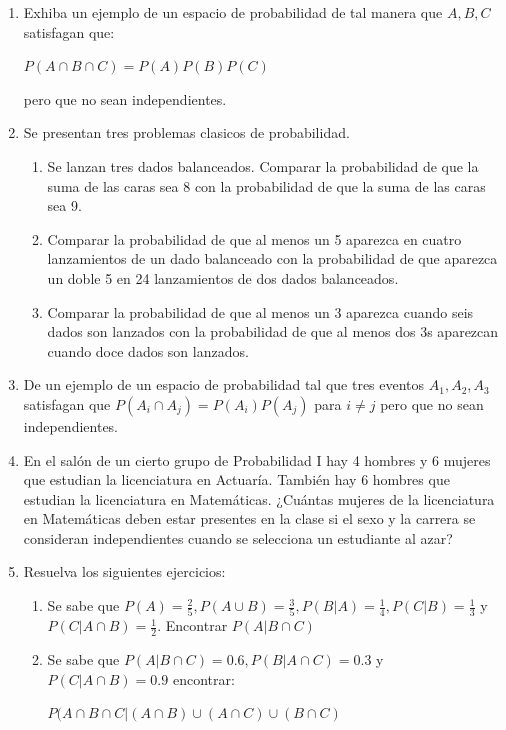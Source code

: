 \documentclass[12pt,a4paper]{report}
\begin{document}
\begin{enumerate}
   \item {
  Exhiba un ejemplo de un espacio de probabilidad de tal manera que $A,B,C$ satisfagan que: \\
  \begin{center}
  $P(A\cap B \cap C) = P(A)P(B)P(C)$
  \end{center}
  pero que no sean independientes.
	}

   \item {
    Se presentan tres problemas clasicos de probabilidad.

    \begin{enumerate}[label=\alph*) ]
    \item{Se lanzan tres dados balanceados. Comparar la probabilidad de que la suma de las caras sea 8 con la probabilidad de que la suma de las caras sea 9.
    }\\

    \item{Comparar la probabilidad de que al menos un 5 aparezca en cuatro lanzamientos de un dado balanceado con la probabilidad de que aparezca un doble 5 en 24 lanzamientos de dos dados balanceados.} \\
    \item{Comparar la probabilidad de que al menos un 3 aparezca cuando seis dados son lanzados con la probabilidad de que al menos dos 3s aparezcan cuando doce dados son lanzados.}
    \end{enumerate}
	}


   \item {
   De un ejemplo de un espacio de probabilidad tal que tres eventos $A_{1},A_{2},A_{3}$ satisfagan que $P(A_{i}\cap A_{j})=P(A_{i})P(A_{j})$ para $i\neq j$ pero que no sean independientes.\\
	}

   \item {En el salón de un cierto grupo de Probabilidad I hay 4 hombres y 6 mujeres que estudian la licenciatura en Actuaría. También hay 6 hombres que estudian la licenciatura en Matemáticas. ¿Cuántas mujeres de la licenciatura en Matemáticas deben estar presentes en la clase si el sexo y la carrera se consideran independientes cuando se selecciona un estudiante al azar?
	}

  \item{
 Resuelva los siguientes ejercicios:\\
 \begin{enumerate}[label=\alph*) ]
 \item{Se sabe que $P(A)= \frac{2}{5},P(A\cup B)=\frac{3}{5},P(B|A)=\frac{1}{4},P(C|B)=\frac{1}{3}$ y $P(C|A\cap B)=\frac{1}{2}$. Encontrar $P(A|B\cap C)$}\\
 \item{Se sabe que $P(A|B\cap C)=0.6, P(B|A\cap C)=0.3$ y $P(C|A\cap B)=0.9$ encontrar: \\
 \begin{center}
 $P(A\cap B\cap C| (A\cap B) \cup (A\cap C) \cup (B\cap C)$
 \end{center} }
 \end{enumerate}
  }



\end{enumerate}
\end{document}
